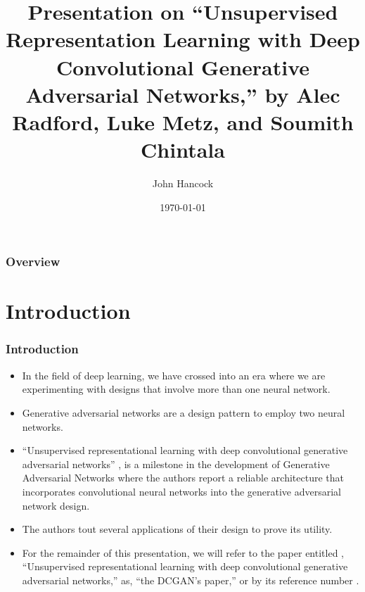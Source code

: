 \documentclass{beamer}
\title[Unsupervised Representation Learning with Deep Convolutional
Generative Adversarial Networks]{Presentation on ``Unsupervised Representation 
Learning with Deep Convolutional Generative Adversarial Networks,'' by Alec Radford, Luke Metz, and Soumith Chintala} %
\author{John Hancock} %
\institute[FAU] %
{
Florida Atlantic University \\ %
\medskip
\textit{jhancoc4@fau.edu} %
}
\date{\today} %
\begin{document}
\begin{frame}
\titlepage %
\end{frame}

\begin{frame}
\frametitle{Overview} %
\tableofcontents %
\end{frame}

\section{Introduction}
\begin{frame}
\frametitle{Introduction}
\begin{itemize}
    \item In the field of deep learning, we have crossed into an era where we
are experimenting with designs that involve more than one neural network.  
    
    \item Generative adversarial networks are a design pattern to employ two
neural networks.  
    
    \item ``Unsupervised representational learning with deep convolutional
generative adversarial networks''  \cite{repLearnDcgan}, is a milestone in the
development of Generative Adversarial Networks where the authors report a
reliable architecture that incorporates convolutional neural networks into the
generative adversarial network design.  
    
    \item The authors tout several applications of their design to prove its
utility.
    
    \item For the remainder of this presentation, we will refer to the paper
entitled , ``Unsupervised representational learning with deep convolutional
generative adversarial networks,'' as,  ``the DCGAN's paper,'' or by its
reference number \cite{repLearnDcgan}.  
\end{itemize}
\end{frame}
\end{document}
